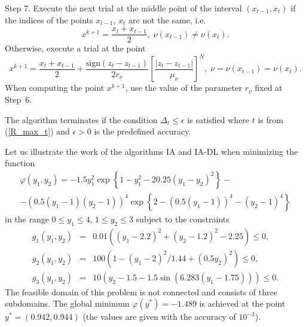 \documentclass[preprint]{elsarticle}
\begin{document}
	Step 7. Execute the next trial at the middle point of the interval $(x_{t-1}, x_t)$ if the indices of the points $x_{t-1}$, $x_t$ are not the same, i.e.
$$
	x^{k+1} = \frac{x_t + x_{t-1}}{2}, \; \nu(x_{t-1}) \neq \nu(x_t).
$$
Otherwise, execute a trial at the point
$$
	x^{k+1} = \frac{x_t+x_{t-1}}{2} + \frac{\mathrm{sign}(z_t-z_{t-1})}{2r_\nu}\left[\frac{\left|z_t-z_{t-1}\right|}{\mu_\nu}\right]^N, \; \nu=\nu(x_{t-1})=\nu(x_t).
$$
When computing the point $x^{k+1}$, use the value of the parameter $r_{\nu}$ fixed at Step~6. 

The algorithm terminates if the condition $\Delta_{t} \leq \epsilon$ is satisfied where $t$ is from (\ref{R_max_t}) and $\epsilon>0$ is the predefined accuracy.

	Let us illustrate the work of the algorithms IA and IA-DL when minimizing the function
\begin{eqnarray}
	\varphi(y_1, y_2)=-1.5y_1^2\exp{\left\{1-y_1^2-20.25(y_1-y_2)^2\right\}}- \nonumber \\
	-\left(0.5(y_1-1)(y_2-1)\right)^4\exp{\left\{2-\left(0.5(y_1-1)\right)^4-(y_2-1)^4\right\}}
	\nonumber
\end{eqnarray}
in the range $0 \leq y_1 \leq 4$, $1 \leq y_2 \leq 3$ subject to the constraints
\begin{eqnarray}
	g_1(y_1, y_2) &=& 0.01 \left( (y_1-2.2)^2+(y_2-1.2)^2-2.25 \right) \leq 0, \nonumber \\
	g_2(y_1, y_2) &=& 100 \left(1-(y_1-2)^2/1.44+(0.5y_2)^2 \right) \leq 0, \nonumber \\
	g_3(y_1, y_2) &=& 10 \left( y_2 - 1.5 - 1.5 \sin{\left( 6.283(y_1-1.75) \right)}\right) \leq 0. \nonumber
\end{eqnarray}
The feasible domain of this problem is not connected and consists of three subdomains. The global minimum $\varphi(y^\ast)=-1.489$ is achieved at the point $y^\ast =(0.942, 0.944)$ (the values are given with the accuracy of $10^{-3}$).
\end{document}
